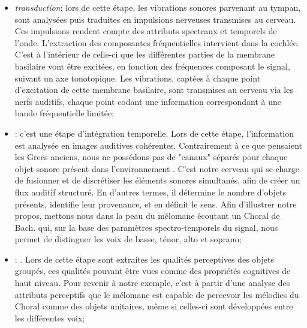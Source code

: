 \begin{itemize}

\item \emph{transduction}: lors de cette étape, les vibrations sonores parvenant au tympan, sont analysées puis traduites en impulsions nerveuses transmises au cerveau. Ces impulsions rendent compte des attributs spectraux et temporels de l'onde. L'extraction des composantes fréquentielles intervient dans la cochlée. C'est à l'intérieur de celle-ci que les différentes parties de la membrane basilaire vont être excitées, en fonction des fréquences composant le signal, suivant un axe tonotopique. Les vibrations, captées à chaque point d’excitation de cette membrane basilaire, sont transmises au cerveau via les nerfs auditifs, chaque point codant une information correspondant à une bande fréquentielle limitée; 

\item {} : c'est une étape d'intégration temporelle. Lors de cette étape, l'information est analysée en images auditives cohérentes. Contrairement à ce que pensaient les Grecs anciens, nous ne possédons pas de "canaux" séparés pour chaque objet sonore présent dans l'environnement \citep{yost1994fundamentals}. C'est notre cerveau qui se charge de fusionner et de discrétiser les éléments sonores simultanés, afin de créer un flux auditif structuré. En d'autres termes, il détermine le nombre d'objets présents, identifie leur provenance, et en définit le sens. Afin d'illustrer notre propos, mettons nous dans la peau du mélomane écoutant un Choral de Bach.   qui, sur la base des paramètres spectro-temporels du signal, nous permet de distinguer les voix de basse, ténor, alto et soprano;

\item {} : . Lors de cette étape sont extraites les qualités perceptives des objets groupés, ces qualités pouvant être vues comme des propriétés cognitives de haut niveau. Pour revenir à notre exemple, c'est à partir d'une analyse des attributs perceptifs que le mélomane est capable de percevoir les mélodies du Choral comme des objets unitaires, même si celles-ci sont développées entre les différentes voix;


\end{itemize}
